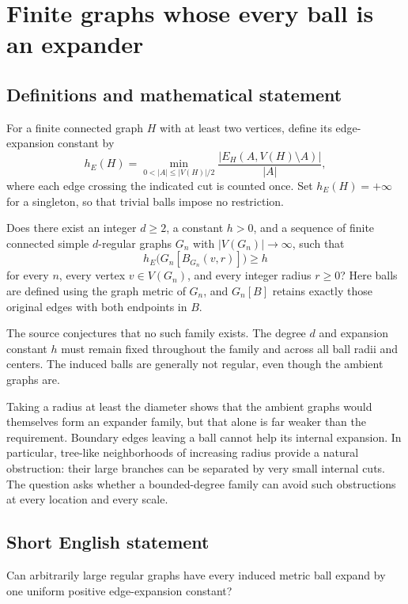 \documentclass[11pt,a4paper]{article}
\begin{document}
\section*{Finite graphs whose every ball is an expander}\label{statement}

\subsection{Definitions and mathematical statement}
For a finite connected graph $H$ with at least two vertices, define its edge-expansion constant by
\[
h_E(H)=\min_{0<|A|\le|V(H)|/2}
\frac{|E_H(A,V(H)\setminus A)|}{|A|},
\]
where each edge crossing the indicated cut is counted once. Set $h_E(H)=+\infty$ for a singleton, so that trivial balls impose no restriction.

Does there exist an integer $d\ge2$, a constant $h>0$, and a sequence of finite connected simple $d$-regular graphs $G_n$ with $|V(G_n)|\to\infty$, such that
\[
h_E\bigl(G_n[B_{G_n}(v,r)]\bigr)\ge h
\]
for every $n$, every vertex $v\in V(G_n)$, and every integer radius $r\ge0$? Here balls are defined using the graph metric of $G_n$, and $G_n[B]$ retains exactly those original edges with both endpoints in $B$.

The source conjectures that no such family exists. The degree $d$ and expansion constant $h$ must remain fixed throughout the family and across all ball radii and centers. The induced balls are generally not regular, even though the ambient graphs are.

Taking a radius at least the diameter shows that the ambient graphs would themselves form an expander family, but that alone is far weaker than the requirement. Boundary edges leaving a ball cannot help its internal expansion. In particular, tree-like neighborhoods of increasing radius provide a natural obstruction: their large branches can be separated by very small internal cuts. The question asks whether a bounded-degree family can avoid such obstructions at every location and every scale.
\subsection{Short English statement}
Can arbitrarily large regular graphs have every induced metric ball expand by one uniform positive edge-expansion constant?
\end{document}
